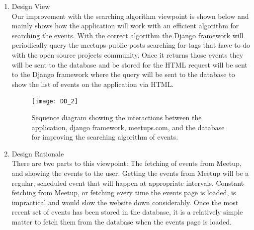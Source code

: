 \documentclass[draftclsnofoot,10pt,onecolumn]{IEEEtran} %
\begin{document}
\begin{enumerate}
\begin{enumerate}
				\item Design View \\ %
				Our improvement with the searching algorithm viewpoint is shown below and mainly shows how the
			    application will work with an efficient algorithm for searching the events. With the correct algorithm the
				Django framework will periodically query the meetups public posts searching for tags that have to do with
				the open source projects community. Once it returns those events they will be sent to the database and be
				stored for the HTML request will be sent to the
				Django framework where the query will be sent to the database to show the list of events on the application
				via HTML.\\
				
				\begin{figure}[H]
  					\begin{center}
						\texttt{[image: DD\_2]}
						\captionsetup{width=.4\linewidth}
						\centering
  						\caption{Sequence diagram showing the interactions between the application, django framework, 
  						meetups.com, and the database for improving the searching algorithm of events.}
  					\end{center}
				\end{figure}
						
				\item Design Rationale \\
				There are two parts to this viewpoint: The fetching of events from Meetup, and showing the events to the
				user. Getting the events from Meetup will be a regular, scheduled event that will happen at appropriate
				intervals. Constant fetching from Meetup, or fetching every time the events page is loaded, is impractical
				and would slow the website down considerably. Once the most recent set of events has been stored in the
				database, it is a relatively simple matter to fetch them from the database when the events page is loaded. \\
				
			\end{enumerate}
			

\end{enumerate}
\end{document}
